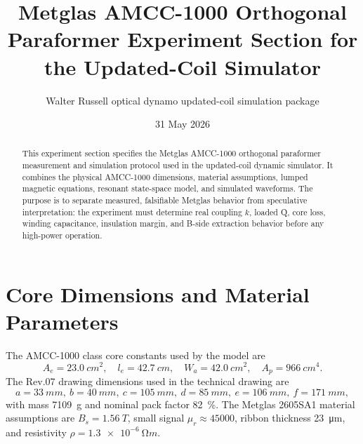 \documentclass[11pt]{article}
\title{Metglas AMCC-1000 Orthogonal Paraformer Experiment Section for the Updated-Coil Simulator}
\author{Walter Russell optical dynamo updated-coil simulation package}
\date{31 May 2026}
\begin{document}
\maketitle

\begin{abstract}
This experiment section specifies the Metglas AMCC-1000 orthogonal paraformer
measurement and simulation protocol used in the updated-coil dynamic simulator.
It combines the physical AMCC-1000 dimensions, material assumptions, lumped
magnetic equations, resonant state-space model, and simulated waveforms.  The
purpose is to separate measured, falsifiable Metglas behavior from speculative
interpretation: the experiment must determine real coupling \(k\), loaded Q,
core loss, winding capacitance, insulation margin, and B-side extraction
behavior before any high-power operation.
\end{abstract}

\section{Core Dimensions and Material Parameters}
The AMCC-1000 class core constants used by the model are
\[
A_e=\SI{23.0}{cm^2},\quad l_e=\SI{42.7}{cm},\quad
W_a=\SI{42.0}{cm^2},\quad A_p=\SI{966}{cm^4}.
\]
The Rev.07 drawing dimensions used in the technical drawing are
\[
a=\SI{33}{mm},\ b=\SI{40}{mm},\ c=\SI{105}{mm},\
d=\SI{85}{mm},\ e=\SI{106}{mm},\ f=\SI{171}{mm},
\]
with mass \SI{7109}{g} and nominal pack factor \SI{82}{\percent}.
The Metglas 2605SA1 material assumptions are \(B_s=\SI{1.56}{T}\), small
signal \(\mu_r\approx 45000\), ribbon thickness \SI{23}{\micro m}, and
resistivity \(\rho=\SI{1.3e-6}{\ohm m}\).

\end{document}
